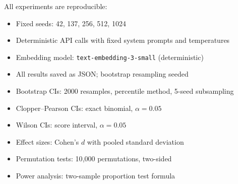 \documentclass[10pt]{article}
\begin{document}
All experiments are reproducible:
\begin{itemize}[leftmargin=*,itemsep=1pt]
\item Fixed seeds: 42, 137, 256, 512, 1024
\item Deterministic API calls with fixed system prompts and temperatures
\item Embedding model: \texttt{text-embedding-3-small} (deterministic)
\item All results saved as JSON; bootstrap resampling seeded
\item Bootstrap CIs: 2000 resamples, percentile method, 5-seed subsampling
\item Clopper--Pearson CIs: exact binomial, $\alpha = 0.05$
\item Wilson CIs: score interval, $\alpha = 0.05$
\item Effect sizes: Cohen's $d$ with pooled standard deviation
\item Permutation tests: 10{,}000 permutations, two-sided
\item Power analysis: two-sample proportion test formula
\end{itemize}
\end{document}

